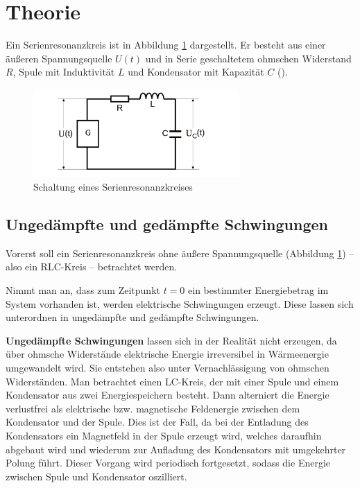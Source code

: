 \section{Theorie}
\label{sec:Theorie}


Ein Serienresonanzkreis ist in Abbildung \ref{fig:serienreson} dargestellt.
Er besteht aus einer äußeren Spannungsquelle $U(t)$ und in Serie
geschaltetem ohmschen Widerstand $R$, Spule mit Induktivität $L$ und Kondensator
mit Kapazität $C$ (\cite{noltingbro}).

\begin{figure}
	\centering
	\includegraphics[width=0.7\textwidth]{Bilder/Aufbau.png}
	\caption{Schaltung eines Serienresonanzkreises \cite{Anleitung}}
	\label{fig:serienreson}
\end{figure}


\subsection{Ungedämpfte und gedämpfte Schwingungen}

Vorerst soll ein Serienresonanzkreis ohne äußere Spannungsquelle (Abbildung \ref{fig:serienreson}) -- also ein RLC-Kreis -- betrachtet werden.

Nimmt man an, dass zum Zeitpunkt $t=0$ ein bestimmter Energiebetrag im System vorhanden ist,
werden elektrische Schwingungen erzeugt.
Diese lassen sich unterordnen in ungedämpfte und gedämpfte Schwingungen.

\textbf{Ungedämpfte Schwingungen} lassen sich in der Realität nicht erzeugen, da über ohmsche
Widerstände elektrische Energie irreversibel in Wärmeenergie umgewandelt wird.
Sie entstehen also unter Vernachlässigung von ohmschen Widerständen.
Man betrachtet einen LC-Kreis, der mit einer Spule und einem Kondensator aus zwei
Energiespeichern besteht.
Dann alterniert die Energie verlustfrei als elektrische bzw. magnetische Feldenergie zwischen dem Kondensator und der Spule.
Dies ist der Fall, da bei der Entladung des Kondensators ein Magnetfeld in der Spule erzeugt
wird, welches daraufhin abgebaut wird und wiederum zur Aufladung des Kondensators mit
umgekehrter Polung führt. Dieser Vorgang wird periodisch fortgesetzt, sodass die Energie zwischen Spule und Kondensator oszilliert.

